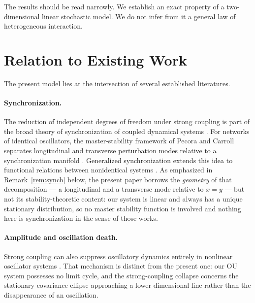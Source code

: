 \documentclass[11pt]{article}
\theoremstyle{plain}
\theoremstyle{remark}
\begin{document}
The results should be read narrowly. We establish an exact property of a two-dimensional linear
stochastic model. We do not infer from it a general law of heterogeneous interaction.

\section{Relation to Existing Work}

The present model lies at the intersection of several established literatures.

\paragraph{Synchronization.} The reduction of independent degrees of freedom under strong
coupling is part of the broad theory of synchronization of coupled dynamical systems
\cite{PikovskyEtAl2001}. For networks of identical oscillators, the master-stability framework
of Pecora and Carroll separates longitudinal and transverse perturbation modes relative to a
synchronization manifold \cite{PecoraCarroll1998}. Generalized synchronization extends this
idea to functional relations between nonidentical systems
\cite{RulkovEtAl1995,KocarevParlitz1996,AbarbanelEtAl1996}. As emphasized in
Remark~\ref{rem:synch} below, the present paper borrows the \emph{geometry} of that
decomposition --- a longitudinal and a transverse mode relative to $x=y$ --- but not its
stability-theoretic content: our system is linear and always has a unique stationary
distribution, so no master stability function is involved and nothing here is
synchronization in the sense of those works.

\paragraph{Amplitude and oscillation death.} Strong coupling can also suppress oscillatory
dynamics entirely in nonlinear oscillator systems \cite{AronsonEtAl1990}. That mechanism is
distinct from the present one: our OU system possesses no limit cycle, and the strong-coupling
collapse concerns the stationary covariance ellipse approaching a lower-dimensional line rather
than the disappearance of an oscillation.
\end{document}

